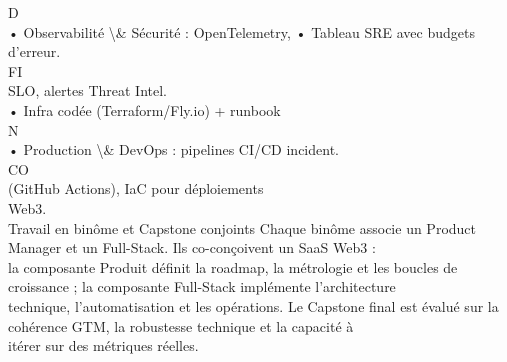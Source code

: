 \vspace{0.5em}
\vspace{0.5em}
D\\
• Observabilité \textbackslash{}& Sécurité : OpenTelemetry, • Tableau SRE avec budgets d’erreur.\\
\vspace{0.5em}
\vspace{0.5em}
\vspace{0.5em}
\vspace{0.5em}
FI\\
SLO, alertes Threat Intel.\\
• Infra codée (Terraform/Fly.io) + runbook\\
\vspace{0.5em}
N\\
• Production \textbackslash{}& DevOps : pipelines CI/CD       incident.\\
CO\\
(GitHub Actions), IaC pour déploiements\\
Web3.\\
\vspace{0.5em}
\vspace{0.5em}
Travail en binôme et Capstone conjoints Chaque binôme associe un Product Manager et un Full-Stack. Ils co-conçoivent un SaaS Web3 :\\
la composante Produit définit la roadmap, la métrologie et les boucles de croissance ; la composante Full-Stack implémente l’architecture\\
technique, l’automatisation et les opérations. Le Capstone final est évalué sur la cohérence GTM, la robustesse technique et la capacité à\\
itérer sur des métriques réelles.\\
\vspace{0.5em}
\vspace{0.5em}
